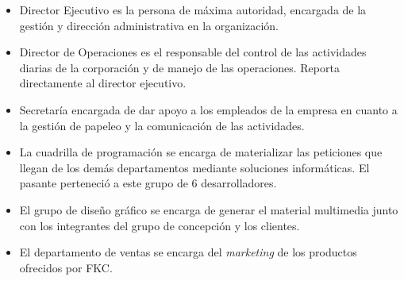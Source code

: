 \begin{itemize}
	\item Director Ejecutivo es la persona de máxima autoridad, encargada de la gestión y dirección administrativa en la organización.

 	\item Director de Operaciones es el responsable del control de las actividades diarias de la corporación y de manejo de las operaciones. Reporta directamente al director ejecutivo.

	\item Secretaría encargada de dar apoyo a los empleados de la empresa en cuanto a la gestión de papeleo y la comunicación de las actividades.

	\item La cuadrilla de programación se encarga de materializar las peticiones que llegan de los demás departamentos mediante soluciones informáticas. El pasante perteneció a este grupo de 6 desarrolladores.

	\item El grupo de diseño gráfico se encarga de generar el material multimedia junto con los integrantes del grupo de concepción y los clientes. 

	\item El departamento de ventas se encarga del \emph{marketing} de los productos ofrecidos por \gls{FKC}.


\end{itemize}







